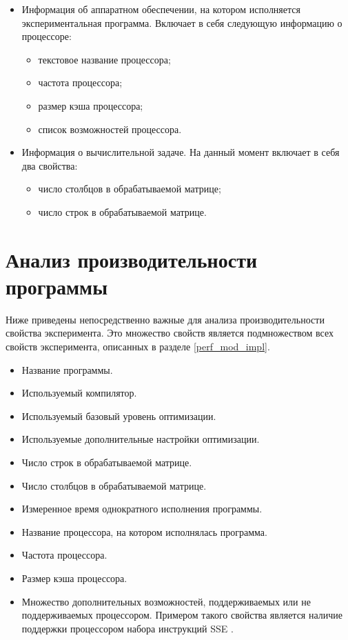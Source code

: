 \begin{itemize}
	\item Информация об аппаратном обеспечении, на котором исполняется экспериментальная программа. Включает в себя следующую информацию о процессоре:
	\begin{itemize}
		\item текстовое название процессора;
		\item частота процессора;
		\item размер кэша процессора;
		\item список возможностей процессора.
	\end{itemize}

	\item Информация о вычислительной задаче. На данный момент включает в себя два свойства:
	\begin{itemize}
		\item число столбцов в обрабатываемой матрице;
		\item число строк в обрабатываемой матрице.
	\end{itemize}
\end{itemize}

\section{Анализ производительности программы}

Ниже приведены непосредственно важные для анализа производительности свойства эксперимента. Это множество свойств является подмножеством всех свойств эксперимента, описанных в разделе \ref{perf_mod_impl}.

\begin{itemize}
	\item Название программы.
	\item Используемый компилятор.
	\item Используемый базовый уровень оптимизации.
	\item Используемые дополнительные настройки оптимизации.
	\item Число строк в обрабатываемой матрице.
	\item Число столбцов в обрабатываемой матрице.
	\item Измеренное время однократного исполнения программы.
	\item Название процессора, на котором исполнялась программа.
	\item Частота процессора.
	\item Размер кэша процессора.
	\item Множество дополнительных возможностей, поддерживаемых или не поддерживаемых процессором. Примером такого свойства является наличие поддержки процессором набора инструкций SSE \cite{sse}.
\end{itemize}